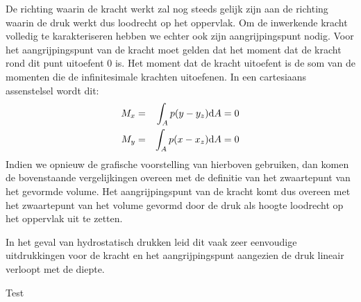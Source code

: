 De richting waarin de kracht werkt zal nog steeds gelijk zijn aan de richting waarin de druk werkt dus loodrecht op het oppervlak. Om de inwerkende kracht volledig te karakteriseren hebben we echter ook zijn aangrijpingspunt nodig. Voor het aangrijpingspunt van de kracht moet gelden dat het moment dat de kracht rond dit punt uitoefent 0 is. Het moment dat de kracht uitoefent is de som van de momenten die de infinitesimale krachten uitoefenen. In een cartesiaans assenstelsel wordt dit:
\begin{eqnarray}
	M_x &=& \int_A  p (y-y_z)  \mathrm{d} A = 0 \\
	M_y &=& \int_A  p (x-x_z)  \mathrm{d} A = 0
\end{eqnarray}
Indien we opnieuw de grafische voorstelling van hierboven gebruiken, dan komen de bovenstaande vergelijkingen overeen met de definitie van het zwaartepunt van het gevormde volume. Het aangrijpingspunt van de kracht komt dus overeen met het zwaartepunt van het volume gevormd door de druk als hoogte loodrecht op het oppervlak uit te zetten.

In het geval van hydrostatisch drukken leid dit vaak zeer eenvoudige uitdrukkingen voor de kracht en het aangrijpingspunt aangezien de druk lineair verloopt met de diepte.

\begin{voorbeeld}
Test
\end{voorbeeld}

